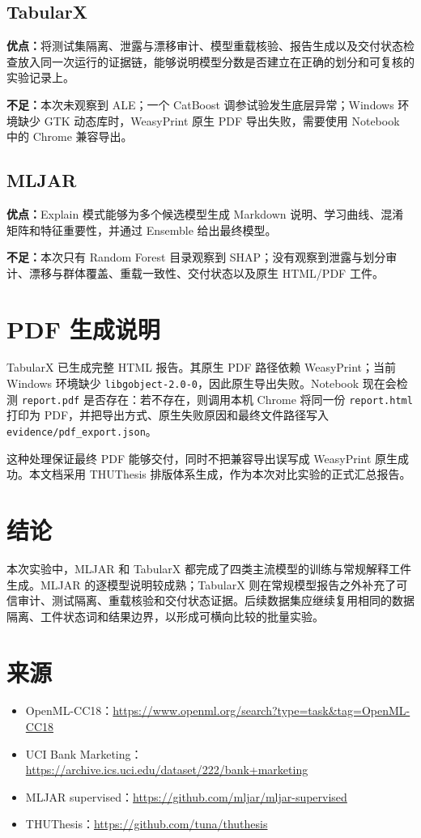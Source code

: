\documentclass[degree=bachelor,language=chinese,fontset=fandol]{thuthesis}
\begin{document}
\section{TabularX}

\textbf{优点：}将测试集隔离、泄露与漂移审计、模型重载核验、报告生成以及交付状态检查放入同一次运行的证据链，能够说明模型分数是否建立在正确的划分和可复核的实验记录上。

\textbf{不足：}本次未观察到 ALE；一个 CatBoost 调参试验发生底层异常；Windows 环境缺少 GTK 动态库时，WeasyPrint 原生 PDF 导出失败，需要使用 Notebook 中的 Chrome 兼容导出。

\section{MLJAR}

\textbf{优点：}Explain 模式能够为多个候选模型生成 Markdown 说明、学习曲线、混淆矩阵和特征重要性，并通过 Ensemble 给出最终模型。

\textbf{不足：}本次只有 Random Forest 目录观察到 SHAP；没有观察到泄露与划分审计、漂移与群体覆盖、重载一致性、交付状态以及原生 HTML/PDF 工件。

\chapter{PDF 生成说明}

TabularX 已生成完整 HTML 报告。其原生 PDF 路径依赖 WeasyPrint；当前 Windows 环境缺少 \texttt{libgobject-2.0-0}，因此原生导出失败。Notebook 现在会检测 \texttt{report.pdf} 是否存在：若不存在，则调用本机 Chrome 将同一份 \texttt{report.html} 打印为 PDF，并把导出方式、原生失败原因和最终文件路径写入 \texttt{evidence/pdf\_export.json}。

这种处理保证最终 PDF 能够交付，同时不把兼容导出误写成 WeasyPrint 原生成功。本文档采用 THUThesis 排版体系生成，作为本次对比实验的正式汇总报告。

\chapter{结论}

本次实验中，MLJAR 和 TabularX 都完成了四类主流模型的训练与常规解释工件生成。MLJAR 的逐模型说明较成熟；TabularX 则在常规模型报告之外补充了可信审计、测试隔离、重载核验和交付状态证据。后续数据集应继续复用相同的数据隔离、工件状态词和结果边界，以形成可横向比较的批量实验。

\backmatter
\chapter{来源}

\begin{itemize}
  \item OpenML-CC18：\url{https://www.openml.org/search?type=task&tag=OpenML-CC18}
  \item UCI Bank Marketing：\url{https://archive.ics.uci.edu/dataset/222/bank+marketing}
  \item MLJAR supervised：\url{https://github.com/mljar/mljar-supervised}
  \item THUThesis：\url{https://github.com/tuna/thuthesis}
\end{itemize}
\end{document}

